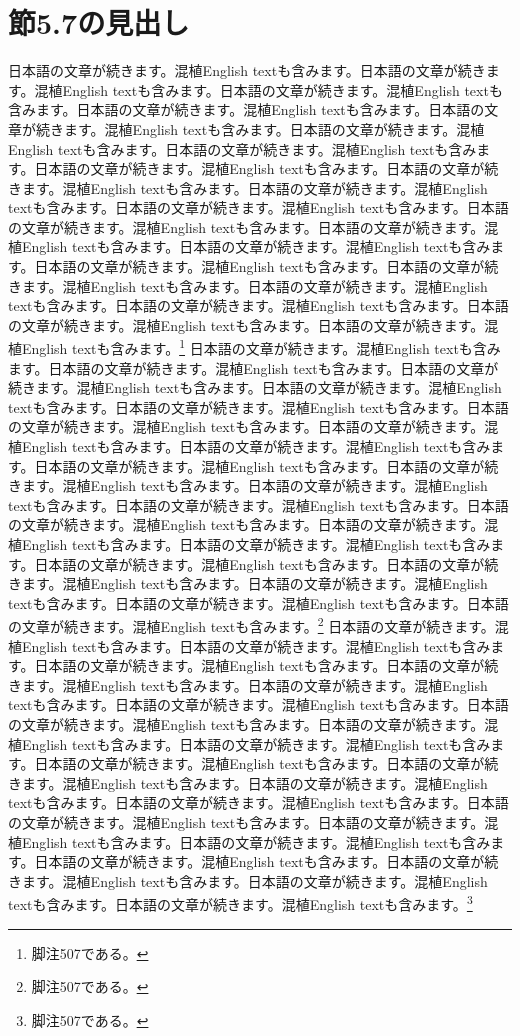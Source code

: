 \documentclass[pdflatex,book]{jlreq}
\begin{document}
\section{節5.7の見出し}
日本語の文章が続きます。混植English textも含みます。日本語の文章が続きます。混植English textも含みます。日本語の文章が続きます。混植English textも含みます。日本語の文章が続きます。混植English textも含みます。日本語の文章が続きます。混植English textも含みます。日本語の文章が続きます。混植English textも含みます。日本語の文章が続きます。混植English textも含みます。日本語の文章が続きます。混植English textも含みます。日本語の文章が続きます。混植English textも含みます。日本語の文章が続きます。混植English textも含みます。日本語の文章が続きます。混植English textも含みます。日本語の文章が続きます。混植English textも含みます。日本語の文章が続きます。混植English textも含みます。日本語の文章が続きます。混植English textも含みます。日本語の文章が続きます。混植English textも含みます。日本語の文章が続きます。混植English textも含みます。日本語の文章が続きます。混植English textも含みます。日本語の文章が続きます。混植English textも含みます。日本語の文章が続きます。混植English textも含みます。日本語の文章が続きます。混植English textも含みます。\footnote{脚注507である。}
日本語の文章が続きます。混植English textも含みます。日本語の文章が続きます。混植English textも含みます。日本語の文章が続きます。混植English textも含みます。日本語の文章が続きます。混植English textも含みます。日本語の文章が続きます。混植English textも含みます。日本語の文章が続きます。混植English textも含みます。日本語の文章が続きます。混植English textも含みます。日本語の文章が続きます。混植English textも含みます。日本語の文章が続きます。混植English textも含みます。日本語の文章が続きます。混植English textも含みます。日本語の文章が続きます。混植English textも含みます。日本語の文章が続きます。混植English textも含みます。日本語の文章が続きます。混植English textも含みます。日本語の文章が続きます。混植English textも含みます。日本語の文章が続きます。混植English textも含みます。日本語の文章が続きます。混植English textも含みます。日本語の文章が続きます。混植English textも含みます。日本語の文章が続きます。混植English textも含みます。日本語の文章が続きます。混植English textも含みます。日本語の文章が続きます。混植English textも含みます。\footnote{脚注507である。}
日本語の文章が続きます。混植English textも含みます。日本語の文章が続きます。混植English textも含みます。日本語の文章が続きます。混植English textも含みます。日本語の文章が続きます。混植English textも含みます。日本語の文章が続きます。混植English textも含みます。日本語の文章が続きます。混植English textも含みます。日本語の文章が続きます。混植English textも含みます。日本語の文章が続きます。混植English textも含みます。日本語の文章が続きます。混植English textも含みます。日本語の文章が続きます。混植English textも含みます。日本語の文章が続きます。混植English textも含みます。日本語の文章が続きます。混植English textも含みます。日本語の文章が続きます。混植English textも含みます。日本語の文章が続きます。混植English textも含みます。日本語の文章が続きます。混植English textも含みます。日本語の文章が続きます。混植English textも含みます。日本語の文章が続きます。混植English textも含みます。日本語の文章が続きます。混植English textも含みます。日本語の文章が続きます。混植English textも含みます。日本語の文章が続きます。混植English textも含みます。\footnote{脚注507である。}
\end{document}
